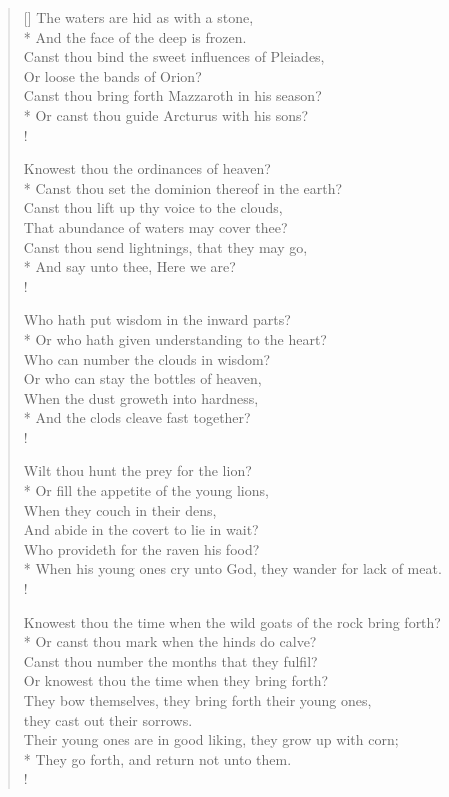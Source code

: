\documentclass[MAIN]{subfiles}
\begin{document}
\begin{verse}[\versewidth]
The waters are hid as with a stone,\\*
\vin And the face of the deep is frozen.\\
Canst thou bind the sweet influences of Pleiades,\\
\vin Or loose the bands of Orion?\\
Canst thou bring forth Mazzaroth in his season?\\*
\vin Or canst thou guide Arcturus with his sons?\\!

Knowest thou the ordinances of heaven?\\*
\vin Canst thou set the dominion thereof in the earth?\\
Canst thou lift up thy voice to the clouds,\\
\vin That abundance of waters may cover thee?\\
Canst thou send lightnings, that they may go,\\*
\vin And say unto thee, Here we are?\\!

Who hath put wisdom in the inward parts?\\*
\vin Or who hath given understanding to the heart?\\
Who can number the clouds in wisdom?\\
\vin Or who can stay the bottles of heaven,\\
When the dust groweth into hardness,\\*
\vin And the clods cleave fast together?\\!

Wilt thou hunt the prey for the lion?\\*
\vin Or fill the appetite of the young lions,\\
When they couch in their dens,\\
\vin And abide in the covert to lie in wait?\\
Who provideth for the raven his food?\\*
\vin When his young ones cry unto God, they wander for lack of meat.\\!

Knowest thou the time when the wild goats of the rock bring forth?\\*
\vin Or canst thou mark when the hinds do calve?\\
Canst thou number the months that they fulfil?\\
\vin Or knowest thou the time when they bring forth?\\
They bow themselves, they bring forth their young ones,\\
\vin they cast out their sorrows.\\
Their young ones are in good liking, they grow up with corn;\\*
\vin They go forth, and return not unto them.\\!


\end{verse}
\end{document}
